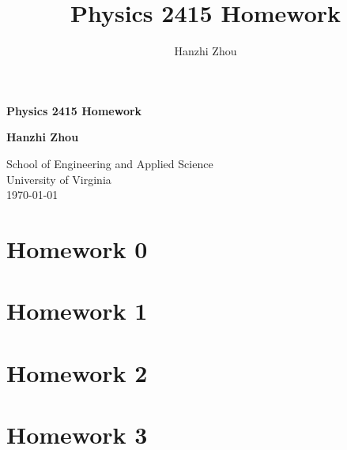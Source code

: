 \documentclass[12pt]{article}
\title{Physics 2415 Homework}
\author{Hanzhi Zhou}
\begin{document}
\begin{titlepage}
	\begin{center}
		\vspace*{1cm}

		\Huge\textbf{Physics 2415 Homework}


		\vspace{1.5cm}

		\textbf{Hanzhi Zhou}

		\vfill
		\vspace{0.8cm}

		\Large
		School of Engineering and Applied Science\\
		\vspace{0.2cm}
		University of Virginia\\
		\vspace{0.2cm}
		\today
		\vspace{1cm}
	\end{center}
	\clearpage
\end{titlepage}

\onehalfspacing
\tableofcontents
\newpage
\singlespacing

\section{Homework 0}



\newpage

\section{Homework 1}




\newpage

\section{Homework 2}




\newpage

\section{Homework 3}



\end{document}
